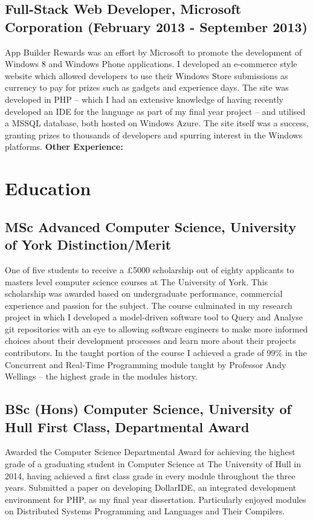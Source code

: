 \documentclass[10pt,letterpaper]{article}
\begin{document}
	\subsection*{Full-Stack Web Developer, Microsoft Corporation \small{(February 2013 - September 2013)}}
	App Builder Rewards was an effort by Microsoft to promote the development of Windows 8 and Windows Phone applications. I developed an e-commerce style website which allowed developers to use their Windows Store submissions as currency to pay for prizes such as gadgets and experience days. The site was developed in PHP -- which I had an extensive knowledge of having recently developed an IDE for the language as part of my final year project -- and utilised a MSSQL database, both hosted on Windows Azure. The site itself was a success, granting prizes to thousands of developers and spurring interest in the Windows platforms.
	\newline \newline
	\bfseries{ Other Experience: } 
	
	\section*{Education}
	\subsection*{MSc Advanced Computer Science, University of York \small{Distinction/Merit}}
	One of five students to receive a \pounds5000 scholarship out of eighty applicants to masters level computer science courses at The University of York. This scholarship was awarded based on undergraduate performance, commercial experience and passion for the subject. The course culminated in my research project in which I developed a model-driven software tool to Query and Analyse git repositories with an eye to allowing software engineers to make more informed choices about their development processes and learn more about their projects contributors. In the taught portion of the course I achieved a grade of 99\% in the Concurrent and Real-Time Programming module taught by Professor Andy Wellings -- the highest grade in the modules history.

	\subsection*{BSc (Hons) Computer Science, University of Hull \small{First Class, Departmental Award}}
	Awarded the Computer Science Departmental Award for achieving the highest grade of a graduating student in Computer Science at The University of Hull in 2014, having achieved a first class grade in every module throughout the three years. Submitted a paper on developing DollarIDE, an integrated development environment for PHP, as my final year dissertation. Particularly enjoyed modules on Distributed Systems Programming and Languages and Their Compilers.
\end{document}
